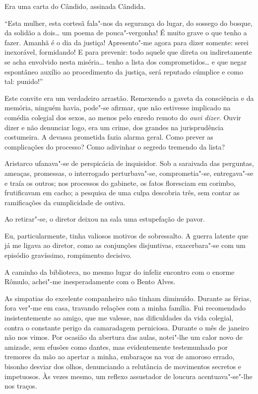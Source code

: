 Era uma carta do Cândido, assinada Cândida. 

``Esta mulher, esta cortesã fala"-nos da segurança do lugar,
do sossego do bosque, da solidão a dois\ldots{} um poema de
pouca"-vergonha! É muito grave o que tenho a fazer. Amanhã é o dia da
justiça! Apresento"-me agora para dizer somente: serei inexorável,
formidando! E para prevenir: todo aquele que direta ou indiretamente se
acha envolvido nesta miséria\ldots{} tenho a lista dos comprometidos\ldots{} e
que negar espontâneo auxílio ao procedimento da justiça, será reputado
cúmplice e como tal: punido!'' 

Este convite era um verdadeiro arrastão.
Remexendo a gaveta da consciência e da memória, ninguém havia,
pode"-se afirmar, que não estivesse implicado na comédia colegial dos
sexos, ao menos pelo enredo remoto do \textit{ouvi dizer}. Ouvir dizer e não
denunciar logo, era um crime, dos grandes na jurisprudência costumeira.
A devassa prometida fazia alarma geral. Como prever as complicações do
processo? Como adivinhar o segredo tremendo da lista? 

Aristarco ufanava"-se de perspicácia de inquisidor. Sob a saraivada das
perguntas, ameaças, promessas, o interrogado perturbava"-se,
comprometia"-se, entregava"-se e traía os outros; nos processos do
gabinete, os fatos floresciam em corimbo, frutificavam em cacho; a
pesquisa de uma culpa descobria três, sem contar as ramificações da
cumplicidade de outiva. 

Ao retirar"-se, o diretor deixou na sala uma
estupefação de pavor. 

Eu, particularmente, tinha valiosos motivos de
sobressalto. A guerra latente que já me ligava ao diretor, como as
conjunções disjuntivas, exacerbara"-se com um episódio gravíssimo,
rompimento decisivo. 

A caminho da biblioteca, no mesmo lugar do infeliz
encontro com o enorme Rômulo, achei"-me inesperadamente com o Bento
Alves. 

As simpatias do excelente companheiro não tinham diminuído.
Durante as férias, fora ver"-me em casa, travando relações com a minha
família. Fui recomendado insistentemente ao amigo, que me valesse, nas
dificuldades da vida colegial, contra o constante perigo da camaradagem
perniciosa. Durante o mês de janeiro não nos vimos. Por ocasião da
abertura das aulas, notei"-lhe um calor novo de amizade, sem efusões
como dantes, mas evidentemente testemunhado por tremores da mão ao
apertar a minha, embaraços na voz de amoroso errado, bisonho desviar
dos olhos, denunciando a relutância de movimentos secretos e
impetuosos. Às vezes mesmo, um reflexo assustador de loucura
acentuava"-se"-lhe nos traços. 

